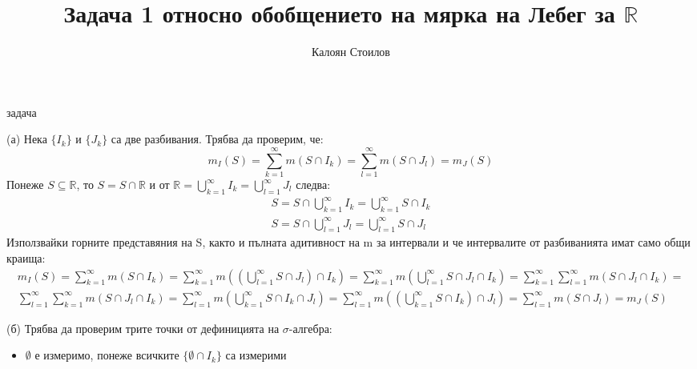 \documentclass[bulgarian, 12pt]{article}
\title{\textbf{Задача 1} относно обобщението на мярка на Лебег за $\mathbb{R}$}
\author{Калоян Стоилов}
\begin{document}
\maketitle
\begin{labeling}{задача}
\item [(а)] Нека $\{I_k\}$ и $\{J_k\}$
  са две разбивания. Трябва да проверим, че:
  \[
    m_I(S) = \sum_{k=1}^{\infty} m(S \cap I_k) = \sum_{l=1}^{\infty} m(S \cap J_l) = m_J(S)
  \]
  Понеже $S \subseteq \mathbb{R}$, то $S = S \cap \mathbb{R}$ и от $\mathbb{R} = \bigcup\limits_{k=1}^{\infty} I_k = \bigcup\limits_{l=1}^{\infty} J_l$ следва:
  \begin{eqnarray*}
    S = S \cap \bigcup\limits_{k=1}^{\infty} I_k = \bigcup\limits_{k=1}^{\infty} S \cap I_k \\
    S = S \cap \bigcup\limits_{l=1}^{\infty} J_l = \bigcup\limits_{l=1}^{\infty} S \cap J_l
  \end{eqnarray*}
  Използвайки горните представяния на S, както и пълната адитивност на m за интервали и че интервалите от разбиванията имат само общи краища:
  \begin{eqnarray*}
    m_I(S) = \sum_{k=1}^{\infty} m(S \cap I_k) = \sum_{k=1}^{\infty} m((\bigcup\limits_{l=1}^{\infty} S \cap J_l) \cap I_k) = \sum_{k=1}^{\infty} m(\bigcup\limits_{l=1}^{\infty} S \cap J_l \cap I_k) = \sum_{k=1}^{\infty} \sum_{l=1}^{\infty} m(S \cap J_l \cap I_k) = \\
    \sum_{l=1}^{\infty} \sum_{k=1}^{\infty} m(S \cap J_l \cap I_k) = \sum_{l=1}^{\infty} m(\bigcup\limits_{k=1}^{\infty} S \cap I_k \cap J_l) = \sum_{l=1}^{\infty} m((\bigcup\limits_{k=1}^{\infty} S \cap I_k) \cap J_l) = \sum_{l=1}^{\infty} m(S \cap J_l) = m_J(S)
  \end{eqnarray*}
\item [(б)] Трябва да проверим трите точки от дефиницията на $\sigma$-алгебра:
  \begin{itemize}
    \item $\emptyset$ е измеримо, понеже всичките $\{\emptyset \cap I_k\}$ са измерими

\end{itemize}
\end{labeling}
\end{document}
